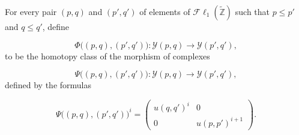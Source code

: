 For every pair $(p,q)$ and $(p',q')$ of elements of
$\mathcal{F}\ell_1(\widetilde{\mathbb Z})$ such that $p\leq p'$ and
$q\leq q'$, define

\begin{equation}
\Phi\bigl((p,q),(p',q')\bigr)\colon
\mathcal Y(p,q)\longrightarrow\mathcal Y(p',q'),
\tag{4.1.1.3}
\end{equation}
to be the homotopy class of the morphism of complexes

\begin{equation}
\Psi\bigl((p,q),(p',q')\bigr)\colon
\mathcal Y(p,q)\longrightarrow\mathcal Y(p',q'),
\tag{4.1.1.4}
\end{equation}
defined by the formulas

\begin{equation}
\Psi\bigl((p,q),(p',q')\bigr)^i
=
\begin{pmatrix}
u(q,q')^i & 0\\
0 & u(p,p')^{i+1}
\end{pmatrix}.
\tag{4.1.1.5}
\end{equation}
\endgroup
